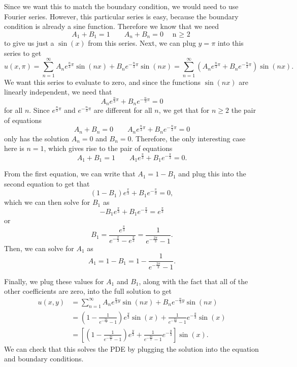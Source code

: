 \begin{exampleSol}
Since we want this to match the boundary condition, we would need to use Fourier series. However, this particular series is easy, because the boundary condition is already a sine function. Therefore we know that we need
\[ A_1 + B_1 = 1 \qquad A_n + B_n = 0 \quad \text{n $\geq$ 2} \] to give us just a $\sin(x)$ from this series. Next, we can plug $y=\pi$ into this series to get
\[ u(x,\pi) = \sum_{n=1}^\infty A_n e^{\frac{n}{3}\pi}\sin(nx) + B_n e^{-\frac{n}{3}\pi}\sin(nx) = \sum_{n=1}^\infty \left( A_n e^{\frac{n}{3}\pi}+ B_n e^{-\frac{n}{3}\pi}\right)\sin(nx).\] We want this series to evaluate to zero, and since the functions $\sin(nx)$ are linearly independent, we need that
\[ A_n e^{\frac{n}{3}\pi}+ B_n e^{-\frac{n}{3}\pi} = 0 \] for all $n$. Since $e^{\frac{n}{3}\pi}$ and $e^{-\frac{n}{3}\pi}$ are different for all $n$, we get that for $n \geq 2$ the pair of equations 
\[ A_n + B_n = 0 \qquad A_n e^{\frac{n}{3}\pi}+ B_n e^{-\frac{n}{3}\pi} = 0\] only has the solution $A_n = 0$ and $B_n = 0$. Therefore, the only interesting case here is $n=1$, which gives rise to the pair of equations
\[ A_1 + B_1 = 1 \qquad A_1 e^{\frac{\pi}{3}}+ B_1 e^{-\frac{\pi}{3}} = 0.\]

From the first equation, we can write that $A_1 = 1 - B_1$ and plug this into the second equation to get that
\[ (1 - B_1)e^{\frac{\pi}{3}} + B_1 e^{-\frac{\pi}{3}} = 0,\] which we can then solve for $B_1$ as
\[ -B_1e^{\frac{\pi}{3}} + B_1e^{-\frac{\pi}{3}} = e^{\frac{\pi}{3}}\] or
\[ B_1 = \frac{e^{\frac{\pi}{3}}}{e^{-\frac{\pi}{3}} - e^{\frac{\pi}{3}}} = \frac{1}{e^{-\frac{2\pi}{3}} - 1}. \]
Then, we can solve for $A_1$ as
\[ A_1 = 1 - B_1 = 1 - \frac{1}{e^{-\frac{2\pi}{3}} - 1}. \]

Finally, we plug these values for $A_1$ and $B_1$, along with the fact that all of the other coefficients are zero, into the full solution to get
\[
\begin{split}
u(x,y) &= \sum_{n=1}^\infty A_n e^{\frac{n}{3}y}\sin(nx) + B_n e^{-\frac{n}{3}y}\sin(nx) \\
&= \left(1 - \frac{1}{e^{-\frac{2\pi}{3}} - 1} \right)e^{\frac{y}{3}}\sin(x) + \frac{1}{e^{-\frac{2\pi}{3}} - 1}e^{-\frac{y}{3}}\sin(x) \\
&= \left[\left(1 - \frac{1}{e^{-\frac{2\pi}{3}} - 1} \right)e^{\frac{y}{3}}+ \frac{1}{e^{-\frac{2\pi}{3}} - 1}e^{-\frac{y}{3}}\right]\sin(x).
\end{split}
\]
We can check that this solves the PDE by plugging the solution into the equation and boundary conditions.
\end{exampleSol}


